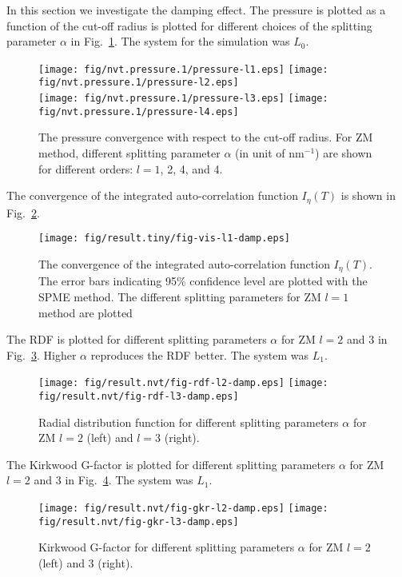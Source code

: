 \documentclass[aip,jcp,a4paper,preprint,unsortedaddress,onecolumn,fleqn]{revtex4-1}
\begin{document}
In this section we investigate the damping effect. The pressure is plotted as a function of  the cut-off radius is plotted for different choices of
the splitting parameter $\alpha$ in Fig.~\ref{fig:damp-pres}. The system for the simulation was $L_0$.
\begin{figure}
  \centering
  \texttt{[image: fig/nvt.pressure.1/pressure-l1.eps]}
  \texttt{[image: fig/nvt.pressure.1/pressure-l2.eps]}\\
  \texttt{[image: fig/nvt.pressure.1/pressure-l3.eps]}
  \texttt{[image: fig/nvt.pressure.1/pressure-l4.eps]}
  \caption{The pressure convergence with respect to the cut-off radius.
    For ZM method, different splitting parameter $\alpha$ (in unit of $\textrm{nm}^{-1}$) are shown for different orders:  $l=1$, 2, 4, and 4.
  }
  \label{fig:damp-pres}
\end{figure}

The convergence of the integrated auto-correlation function $I_\eta(T) $ is shown in Fig.~\ref{fig:damp-vis-l1}.
\begin{figure}
  \centering
  \texttt{[image: fig/result.tiny/fig-vis-l1-damp.eps]}
  \caption{The convergence of the integrated auto-correlation function $I_\eta(T) $. The error bars indicating 95\% confidence level are plotted with the SPME method. The different splitting parameters for ZM $l=1$ method are plotted}
  \label{fig:damp-vis-l1}
\end{figure}


The RDF is plotted for different splitting parameters $\alpha$ for ZM $l=2$ and 3 in Fig.~\ref{fig:damp-rdf-l23}. Higher $\alpha$ reproduces the RDF better.
The system was $L_1$.
\begin{figure}[]
  \centering
  \texttt{[image: fig/result.nvt/fig-rdf-l2-damp.eps]}
  \texttt{[image: fig/result.nvt/fig-rdf-l3-damp.eps]}
  \caption{Radial distribution function for different splitting parameters $\alpha$ for ZM $l=2$ (left) and $l=3$ (right).}
  \label{fig:damp-rdf-l23}
\end{figure}

The Kirkwood G-factor is plotted for different splitting parameters $\alpha$ for ZM $l=2$ and 3 in Fig.~\ref{fig:damp-gkr-l23}. 
The system was $L_1$.
\begin{figure}[]
  \centering
  \texttt{[image: fig/result.nvt/fig-gkr-l2-damp.eps]}
  \texttt{[image: fig/result.nvt/fig-gkr-l3-damp.eps]}
  \caption{Kirkwood G-factor for different splitting parameters $\alpha$ for ZM $l=2$ (left) and 3 (right).}
  \label{fig:damp-gkr-l23}
\end{figure}
\end{document}
